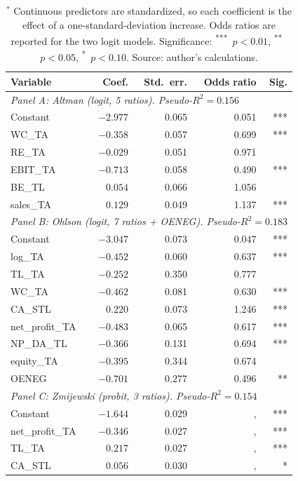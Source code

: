 \documentclass[12pt,a4paper]{article}
\begin{document}
\begin{table}[ht]
\centering
\caption{Re-estimated econometric models at horizon H1.$^{*}$}
\label{tab:econ-coef}
\small
\begin{tabular}{lrrrr}
\toprule
Variable & Coef. & Std.\ err. & Odds ratio & Sig. \\
\midrule
\multicolumn{5}{l}{\textit{Panel A: Altman (logit, 5 ratios). Pseudo-$R^2 = 0.156$}} \\
\midrule
Constant            & $-2.977$ & 0.065 & 0.051 & *** \\
WC\_TA              & $-0.358$ & 0.057 & 0.699 & *** \\
RE\_TA              & $-0.029$ & 0.051 & 0.971 &     \\
EBIT\_TA            & $-0.713$ & 0.058 & 0.490 & *** \\
BE\_TL              & $ 0.054$ & 0.066 & 1.056 &     \\
sales\_TA           & $ 0.129$ & 0.049 & 1.137 & *** \\
\midrule
\multicolumn{5}{l}{\textit{Panel B: Ohlson (logit, 7 ratios + OENEG). Pseudo-$R^2 = 0.183$}} \\
\midrule
Constant            & $-3.047$ & 0.073 & 0.047 & *** \\
log\_TA             & $-0.452$ & 0.060 & 0.637 & *** \\
TL\_TA              & $-0.252$ & 0.350 & 0.777 &     \\
WC\_TA              & $-0.462$ & 0.081 & 0.630 & *** \\
CA\_STL             & $ 0.220$ & 0.073 & 1.246 & *** \\
net\_profit\_TA     & $-0.483$ & 0.065 & 0.617 & *** \\
NP\_DA\_TL          & $-0.366$ & 0.131 & 0.694 & *** \\
equity\_TA          & $-0.395$ & 0.344 & 0.674 &     \\
OENEG               & $-0.701$ & 0.277 & 0.496 & **  \\
\midrule
\multicolumn{5}{l}{\textit{Panel C: Zmijewski (probit, 3 ratios). Pseudo-$R^2 = 0.154$}} \\
\midrule
Constant            & $-1.644$ & 0.029 &,   & *** \\
net\_profit\_TA     & $-0.346$ & 0.027 &,   & *** \\
TL\_TA              & $ 0.217$ & 0.027 &,   & *** \\
CA\_STL             & $ 0.056$ & 0.030 &,   & *   \\
\bottomrule
\end{tabular}
\caption*{\footnotesize $^{*}$ Continuous predictors are standardized, so each
coefficient is the effect of a one-standard-deviation increase. Odds ratios are
reported for the two logit models. Significance: \textsuperscript{***}~$p<0.01$,
\textsuperscript{**}~$p<0.05$, \textsuperscript{*}~$p<0.10$. Source: author's
calculations.}
\end{table}
\end{document}
